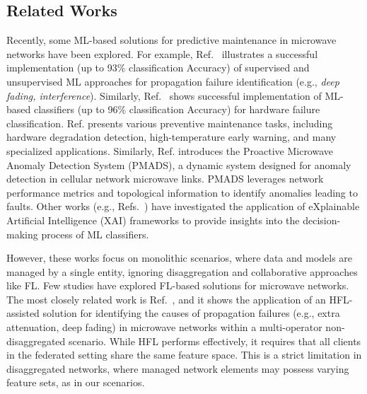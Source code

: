 \subsection{Related Works}
Recently, some ML-based solutions for predictive maintenance in microwave networks have been explored. For example, Ref.~\cite{9266116} illustrates a successful implementation (up to 93\% classification Accuracy) of supervised and unsupervised ML approaches for propagation failure identification (e.g., \emph{deep fading, interference}). Similarly, Ref.~\cite{datacentric, ASAP} shows successful implementation of ML-based classifiers (up to 96\% classification Accuracy) for hardware failure classification.   Ref.\cite{Ericsson2023Microwave} presents various preventive maintenance tasks, including hardware degradation detection, high-temperature early warning, and many specialized applications. 
Similarly, Ref.\cite{PAN2020106969} introduces the Proactive Microwave Anomaly Detection System (PMADS), a dynamic system designed for anomaly detection in cellular network microwave links. PMADS leverages network performance metrics and topological information to identify anomalies leading to faults. Other works (e.g., Refs.~\cite{AYOUB2022109466,9758095}) have investigated the application of eXplainable Artificial Intelligence (XAI) frameworks to provide insights into the decision-making process of ML classifiers. 

However, these works focus on monolithic scenarios, where data and models are managed by a single entity, ignoring disaggregation and collaborative approaches like FL. Few studies have explored FL-based solutions for microwave networks.
The most closely related work is Ref.~\cite{9927592}, and it shows the application of an HFL-assisted solution for identifying the causes of propagation failures (e.g., extra attenuation, deep fading) in microwave networks within a multi-operator non-disaggregated scenario. While HFL performs effectively, it requires that all clients in the federated setting share the same feature space. This is a strict limitation in disaggregated networks, where managed network elements may possess varying feature sets, as in our scenarios. 

